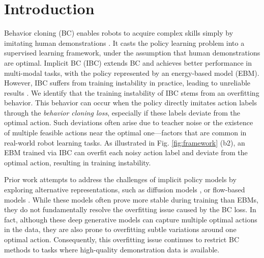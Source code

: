 \section{Introduction}
\label{sec:introduction}






Behavior cloning (BC) enables robots to acquire complex skills simply by imitating human demonstrations \cite{2018_review_IL, 2020_Survey_LfD, 2023_Survey_LfD, 2024_IJRR_survery_feedback_types}. 
It casts the policy learning problem into a supervised learning framework, under the assumption that human demonstrations are optimal.
Implicit BC (IBC) extends BC and achieves better performance in multi-modal tasks, with the policy represented by an energy-based model (EBM).
However, IBC suffers from training instability in practice, leading to unreliable results  \cite{2023_diffusionpolicy, 2022_arxiv_IBC_gaps}. 
We identify that the training instability of IBC stems from an overfitting behavior. This behavior can occur when the policy directly imitates action labels through the \emph{behavior cloning loss}, especially if these labels deviate from the optimal action.
Such deviations often arise due to teacher noise or the existence of multiple feasible actions near the optimal one—factors that are common in real-world robot learning tasks.
As illustrated in Fig. \ref{fig:framework} (b2), an EBM trained via IBC can overfit each noisy action label and deviate from the optimal action, resulting in training instability.

Prior work attempts to address the challenges of implicit policy models by exploring alternative representations, such as diffusion models \cite{2023_diffusionpolicy, 2023_score_diffusion_policy}, or flow-based models \cite{2024_arxiv_flow_matching_policy}.  
While these models often prove more stable during training than EBMs, they do not fundamentally resolve the overfitting issue caused by the BC loss. In fact, although these deep generative models \cite{2024_survey_deep_generative_model_in_robotics, 2023_diffusionpolicy, 2022_implicit_BC} can capture multiple optimal actions in the data, they are also prone to overfitting subtle variations around one optimal action. Consequently, this overfitting issue continues to restrict BC methods to tasks where high-quality demonstration data is available.


